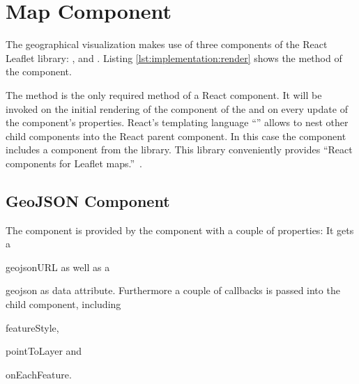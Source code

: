 

\section{Map Component}

The geographical visualization makes use of three components of the React Leaflet library:
,  and .
Listing \ref{lst:implementation:render} shows the  method of the component.



The  method is the only required method of a React component.
It will be invoked on the initial rendering of the component of the  and on every update of the component's properties.
React's templating language ``'' allows to nest other child components into the React parent component.
In this case the  component includes a   component from the  library.
This library conveniently provides ``React components for Leaflet maps.''~\cite{ReactLeaflet2017}.

\subsection{GeoJSON Component}

The  component is provided by the  component with a couple of properties:
It gets a
\begin{enumerate*}[label=(\arabic*)]
  \item
    geojsonURL as well as a
  \item
    geojson as data attribute. Furthermore a couple of callbacks is passed into the child component, including
  \item
    featureStyle,
  \item
    pointToLayer and
  \item
    onEachFeature.
\end{enumerate*}

